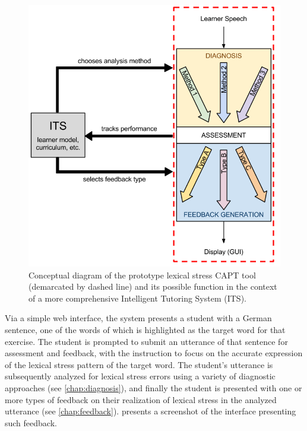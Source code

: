 	\begin{figure}[tb] 
		\centering
		\includegraphics[height=.45\textheight]{img/hourglass-ITS} 
		\caption[Conceptual diagram of the prototype lexical stress CAPT tool]{Conceptual diagram of the prototype lexical stress CAPT tool (demarcated by dashed line) and its possible function in the context of a more comprehensive Intelligent Tutoring System (ITS).}
		\label{fig:hourglass-ITS}
	\end{figure}

 Via a simple web interface, the system presents a student with a German sentence,
 one of the words of which is highlighted as the target word for that exercise. The student is prompted to submit an utterance of that sentence for assessment and feedback, with the instruction to focus on the accurate expression of the lexical stress pattern of the target word. The student's utterance is subsequently analyzed for lexical stress errors using a variety of diagnostic approaches (see \cref{chap:diagnosis}), and finally the student is presented with one or more types of feedback on their realization of lexical stress in the analyzed utterance (see \cref{chap:feedback}).  presents a screenshot of the interface presenting such feedback.

